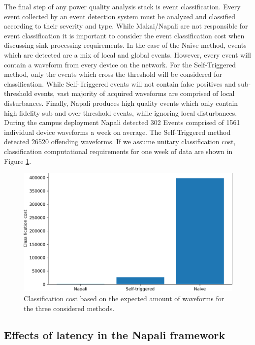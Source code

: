 The final step of any power quality analysis stack is event classification.
Every event collected by an event detection system must be analyzed and classified according to their severity and type.
While Makai/Napali are not responsible for event classification it is important to consider the event classification cost when discussing sink processing requirements.
In the case of the Naive method, events which are detected are a mix of local and global events.
However, every event will contain a waveform from every device on the network.
For the Self-Triggered method, only the events which cross the threshold will be considered for classification.
While Self-Triggered events will not contain false positives and sub-threshold events, vast majority of acquired waveforms are comprised of local disturbances.
Finally, Napali produces high quality events which only contain high fidelity sub and over threshold events, while ignoring local disturbances.
During the campus deployment Napali detected 302 Events comprised of 1561 individual device waveforms a week on average.
The Self-Triggered method detected 26520 offending waveforms.
If we assume unitary classification cost, classification computational requirements for one week of data are shown in Figure \ref{expdes:fig:classification}.
\begin{figure}[ht!]
    \centering
    \includegraphics[width=0.8\linewidth]{img/napali_eval/classification_cost.pdf}
    \caption{Classification cost based on the expected amount of waveforms for the three considered methods.}
    \label{expdes:fig:classification}
\end{figure}


\subsection{Effects of latency in the Napali framework}\label{subsec:effects-of-latency-in-the-napali-framework}

